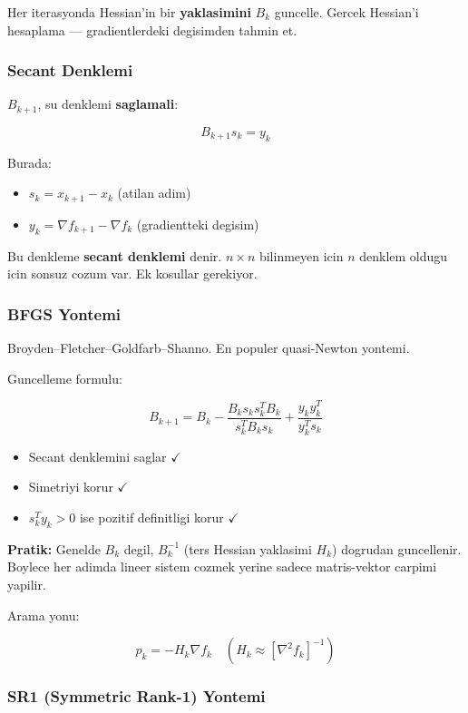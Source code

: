\documentclass[12pt,a4paper]{article}
\theoremstyle{definition}
\theoremstyle{remark}
\begin{document}
Her iterasyonda Hessian'in bir \textbf{yaklasimini} $B_k$ guncelle. Gercek Hessian'i hesaplama --- gradientlerdeki degisimden tahmin et.

\subsubsection{Secant Denklemi}

$B_{k+1}$, su denklemi \textbf{saglamali}:

\[
B_{k+1} s_k = y_k
\]

Burada:
\begin{itemize}[leftmargin=*, itemsep=0.2em]
\item $s_k = x_{k+1} - x_k$ (atilan adim)
\item $y_k = \nabla f_{k+1} - \nabla f_k$ (gradientteki degisim)
\end{itemize}

Bu denkleme \textbf{secant denklemi} denir. $n \times n$ bilinmeyen icin $n$ denklem oldugu icin sonsuz cozum var. Ek kosullar gerekiyor.

\subsubsection{BFGS Yontemi}

Broyden--Fletcher--Goldfarb--Shanno. En populer quasi-Newton yontemi.

Guncelleme formulu:

\[
B_{k+1} = B_k - \frac{B_k s_k s_k^T B_k}{s_k^T B_k s_k} + \frac{y_k y_k^T}{y_k^T s_k}
\]

\begin{itemize}[leftmargin=*, itemsep=0.2em]
\item Secant denklemini saglar $\checkmark$
\item Simetriyi korur $\checkmark$
\item $s_k^T y_k > 0$ ise pozitif definitligi korur $\checkmark$
\end{itemize}

\textbf{Pratik:} Genelde $B_k$ degil, $B_k^{-1}$ (ters Hessian yaklasimi $H_k$) dogrudan guncellenir. Boylece her adimda lineer sistem cozmek yerine sadece matris-vektor carpimi yapilir.

Arama yonu:

\[
p_k = -H_k \nabla f_k \quad (H_k \approx [\nabla^2 f_k]^{-1})
\]

\subsubsection{SR1 (Symmetric Rank-1) Yontemi}
\end{document}
